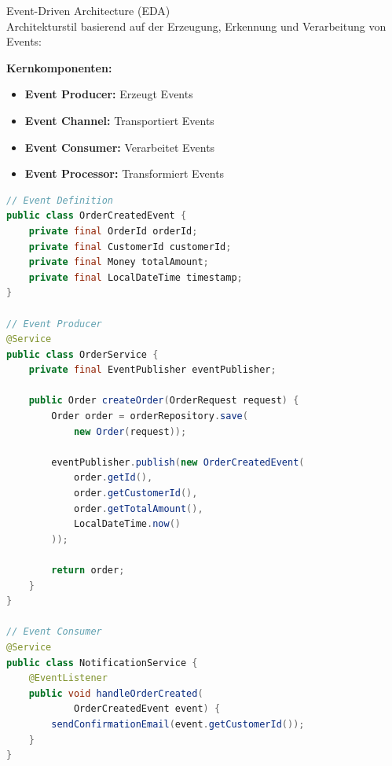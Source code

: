 \begin{concept}{Event-Driven Architecture (EDA)}\\
Architekturstil basierend auf der Erzeugung, Erkennung und Verarbeitung von Events:

\textbf{Kernkomponenten:}
\begin{itemize}
    \item \textbf{Event Producer:} Erzeugt Events
    \item \textbf{Event Channel:} Transportiert Events
    \item \textbf{Event Consumer:} Verarbeitet Events
    \item \textbf{Event Processor:} Transformiert Events
\end{itemize}

\begin{lstlisting}[language=Java, style=basesmol]
// Event Definition
public class OrderCreatedEvent {
    private final OrderId orderId;
    private final CustomerId customerId;
    private final Money totalAmount;
    private final LocalDateTime timestamp;
}

// Event Producer
@Service
public class OrderService {
    private final EventPublisher eventPublisher;
    
    public Order createOrder(OrderRequest request) {
        Order order = orderRepository.save(
            new Order(request));
        
        eventPublisher.publish(new OrderCreatedEvent(
            order.getId(),
            order.getCustomerId(),
            order.getTotalAmount(),
            LocalDateTime.now()
        ));
        
        return order;
    }
}

// Event Consumer
@Service
public class NotificationService {
    @EventListener
    public void handleOrderCreated(
            OrderCreatedEvent event) {
        sendConfirmationEmail(event.getCustomerId());
    }
}
\end{lstlisting}
\end{concept}


